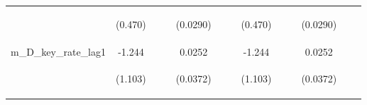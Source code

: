 \documentclass[]{article}
\begin{document}
\begin{center}
\begin{tabular}{lcccccccccccc}
\vspace{4pt} & \begin{footnotesize}(0.470)\end{footnotesize} & \begin{footnotesize}\end{footnotesize} & \begin{footnotesize}\end{footnotesize} & \begin{footnotesize}(0.0290)\end{footnotesize} & \begin{footnotesize}\end{footnotesize} & \begin{footnotesize}\end{footnotesize} & \begin{footnotesize}(0.470)\end{footnotesize} & \begin{footnotesize}\end{footnotesize} & \begin{footnotesize}\end{footnotesize} & \begin{footnotesize}(0.0290)\end{footnotesize} & \begin{footnotesize}\end{footnotesize} & \begin{footnotesize}\end{footnotesize} \\
m\_D\_key\_rate\_lag1 & -1.244 &  &  & 0.0252 &  &  & -1.244 &  &  & 0.0252 &  &  \\
\vspace{4pt} & \begin{footnotesize}(1.103)\end{footnotesize} & \begin{footnotesize}\end{footnotesize} & \begin{footnotesize}\end{footnotesize} & \begin{footnotesize}(0.0372)\end{footnotesize} & \begin{footnotesize}\end{footnotesize} & \begin{footnotesize}\end{footnotesize} & \begin{footnotesize}(1.103)\end{footnotesize} & \begin{footnotesize}\end{footnotesize} & \begin{footnotesize}\end{footnotesize} & \begin{footnotesize}(0.0372)\end{footnotesize} & \begin{footnotesize}\end{footnotesize} & \begin{footnotesize}\end{footnotesize} \\

\end{tabular}
\end{center}
\end{document}
